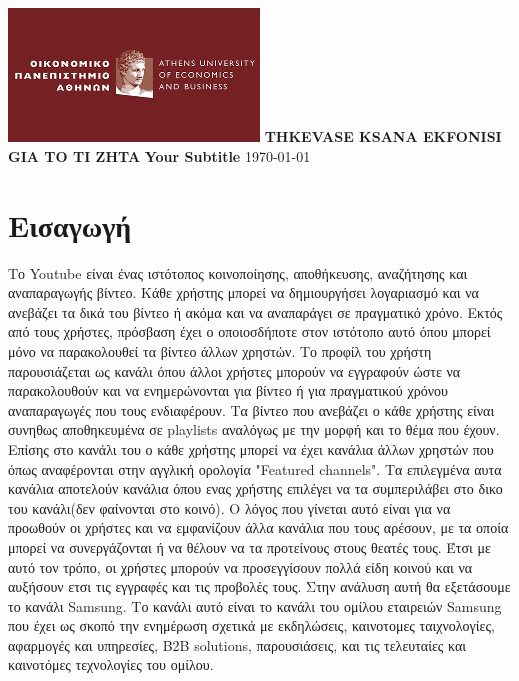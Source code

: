 \documentclass[12pt]{article}
\begin{document}
	
	\begin{titlepage}
		\centering
		\includegraphics[width=0.5\textwidth]{photos-files/aueb_logo.jpg}
		\vfill
		\Huge\textbf{THKEVASE KSANA EKFONISI GIA TO TI ZHTA}
		\vspace{1cm}
		\Large\textbf{Your Subtitle}
		\vfill
		\today
	\end{titlepage}
	
	\renewcommand{\contentsname}{Περιεχόμενα}
	\tableofcontents
	
	\newpage  %
	
	\section{Εισαγωγή}
	Το Youtube είναι ένας ιστότοπος κοινοποίησης, αποθήκευσης, αναζήτησης και αναπαραγωγής βίντεο. Κάθε χρήστης μπορεί να δημιουργήσει λογαριασμό και να ανεβάζει τα δικά του βίντεο ή ακόμα και να αναπαράγει σε πραγματικό χρόνο. Εκτός από τους χρήστες, πρόσβαση έχει ο οποιοσδήποτε στον ιστότοπο αυτό όπου μπορεί μόνο να παρακολουθεί τα βίντεο άλλων χρηστών. Το προφίλ του χρήστη παρουσιάζεται ως κανάλι όπου άλλοι χρήστες μπορούν να εγγραφούν ώστε να παρακολουθούν και να ενημερώνονται για βίντεο ή για πραγματικού χρόνου αναπαραγωγές που τους ενδιαφέρουν. Τα βίντεο που ανεβάζει ο κάθε χρήστης είναι συνηθως αποθηκευμένα σε playlists αναλόγως με την μορφή και το θέμα που έχουν. Επίσης στο κανάλι του ο κάθε χρήστης μπορεί να έχει κανάλια άλλων χρηστών που όπως αναφέρονται στην αγγλική ορολογία "Featured channels". Τα επιλεγμένα αυτα κανάλια αποτελούν κανάλια όπου ενας χρήστης επιλέγει να τα συμπεριλάβει στο δικο του κανάλι(δεν φαίνονται στο κοινό). Ο λόγος που γίνεται αυτό είναι για να προωθούν οι χρήστες και να εμφανίζουν άλλα κανάλια που τους αρέσουν, με τα οποία μπορεί να συνεργάζονται ή να θέλουν να τα προτείνους στους θεατές τους. Έτσι με αυτό τον τρόπο, οι χρήστες μπορούν να προσεγγίσουν πολλά είδη κοινού και να αυξήσουν ετσι τις εγγραφές και τις προβολές τους. Στην ανάλυση αυτή θα εξετάσουμε το κανάλι Samsung. Το κανάλι αυτό είναι το κανάλι του ομίλου εταιρειών Samsung που έχει ως σκοπό την ενημέρωση σχετικά με εκδηλώσεις, καινοτομες ταιχνολογίες, αφαρμογές και υπηρεσίες,  B2B solutions, παρουσιάσεις, και τις τελευταίες και καινοτόμες τεχνολογίες του ομίλου.
	\label{chap:intro_1}
	
\end{document}
